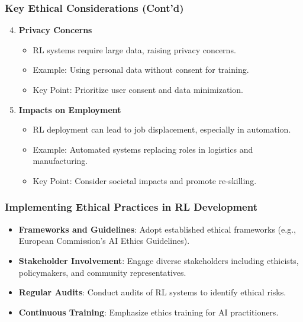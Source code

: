 \documentclass[aspectratio=169]{beamer}
\begin{document}
\begin{frame}[fragile]
    \frametitle{Key Ethical Considerations (Cont'd)}
    \begin{enumerate}
        \setcounter{enumi}{3} %
        \item \textbf{Privacy Concerns}
        \begin{itemize}
            \item RL systems require large data, raising privacy concerns.
            \item Example: Using personal data without consent for training.
            \item Key Point: Prioritize user consent and data minimization.
        \end{itemize}

        \item \textbf{Impacts on Employment}
        \begin{itemize}
            \item RL deployment can lead to job displacement, especially in automation.
            \item Example: Automated systems replacing roles in logistics and manufacturing.
            \item Key Point: Consider societal impacts and promote re-skilling.
        \end{itemize}
    \end{enumerate}
\end{frame}

\begin{frame}[fragile]
    \frametitle{Implementing Ethical Practices in RL Development}
    \begin{itemize}
        \item \textbf{Frameworks and Guidelines}: Adopt established ethical frameworks (e.g., European Commission's AI Ethics Guidelines).
        \item \textbf{Stakeholder Involvement}: Engage diverse stakeholders including ethicists, policymakers, and community representatives.
        \item \textbf{Regular Audits}: Conduct audits of RL systems to identify ethical risks.
        \item \textbf{Continuous Training}: Emphasize ethics training for AI practitioners.
    \end{itemize}
\end{frame}
\end{document}
